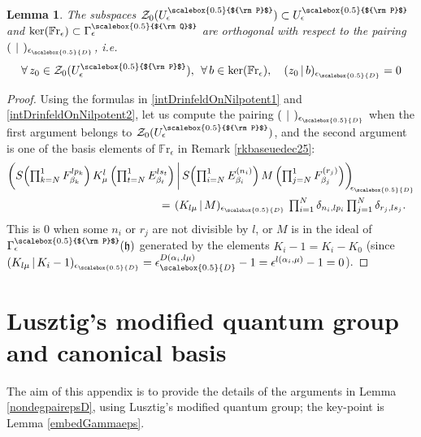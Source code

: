 \documentclass[11pt]{amsart}
\newtheorem{lem}[teo]{Lemma}
\newcommand{\e}{\epsilon}
\newcommand{\eD}{\epsilon_{\scalebox{0.5}{D}}}
\newcommand{\Q}{{\scalebox{0.5}{${\rm Q}$}}}
\newcommand{\Pup}{{\scalebox{0.5}{${\rm P}$}}}
\begin{document}
\begin{lem}\label{lemmaKerFrZ0}
The subspaces $\mathcal{Z}_0(U^\Pup_\e) \subset U^\Pup_\e$ and $\mathrm{ker}(\mathbb{F}\mathrm{r}_\e) \subset \Gamma_\e^\Q$ are orthogonal with respect to the pairing $(\:\,|\,\:)_{\eD}$, {\it i.e.} 
\[ \forall \, z_0 \in \mathcal{Z}_0(U^\Pup_\e),\:\:\forall \, b \in \mathrm{ker}(\mathbb{F}\mathrm{r}_\e), \quad (z_0\,|\,b)_{\eD} = 0 \]
\end{lem}
\begin{proof} Using the formulas in \eqref{intDrinfeldOnNilpotent1} and \eqref{intDrinfeldOnNilpotent2}, let us compute the pairing $(\:\,|\,\:)_{\eD}$ when the first argument belongs to $\mathcal{Z}_0(U^\Pup_\e)$, and the second argument is one of the basis elements of $\mathbb{F}\mathrm{r}_\e$ in Remark \ref{rkbaseuedec25}:
\begin{align*}
\textstyle \biggl( S\!\left(\prod_{k=N}^1 F_{\beta_k}^{lp_k}\right) K_\mu^l \left(\prod_{t=N}^1 E_{\beta_t}^{ls_t}\right) & \,\bigg|\, S\!\textstyle \left(\prod_{i=N}^1 E_{\beta_i}^{(n_i)} \right) M \left(\prod_{j=N}^1 F_{\beta_j}^{(r_j)}\right) \biggr)_{\!\!\eD} \\
=\:\,&\textstyle (K_{l\mu}\,|\,M)_{\eD} \, \prod_{i=1}^N \delta_{n_i,lp_i} \prod_{j=1}^N \delta_{r_j,l s_j}.
\end{align*}
This is $0$ when some $n_i$ or $r_j$ are not divisible by $l$, or $M$ is in the ideal of $\Gamma_\e^\Pup(\mathfrak{h})$ generated by the elements $K_i - 1 = K_i - K_0$ (since $(K_{l\mu}\,|\,K_i - 1)_{\eD}=\eD^{D(\alpha_i,l\mu)} - 1 = \e^{l(\alpha_i,\mu)} - 1 = 0$).
\end{proof}

\section{Lusztig's modified quantum group and canonical basis}\label{appLusztigModif}

The aim of this appendix is to provide the details of the arguments in Lemma \ref{nondegpairepsD}, using Lusztig's modified quantum group; the key-point is Lemma \ref{embedGammaeps}.
\end{document}
